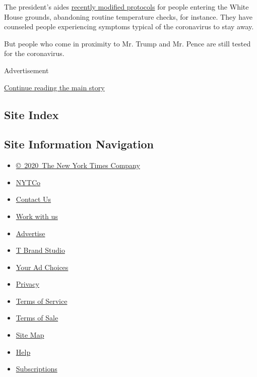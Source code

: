 The president's aides
\href{https://www.nytimes.com/2020/06/22/us/politics/white-house-coronavirus-restrictions.html}{recently
modified protocols} for people entering the White House grounds,
abandoning routine temperature checks, for instance. They have counseled
people experiencing symptoms typical of the coronavirus to stay away.

But people who come in proximity to Mr. Trump and Mr. Pence are still
tested for the coronavirus.

Advertisement

\protect\hyperlink{after-bottom}{Continue reading the main story}

\hypertarget{site-index}{%
\subsection{Site Index}\label{site-index}}

\hypertarget{site-information-navigation}{%
\subsection{Site Information
Navigation}\label{site-information-navigation}}

\begin{itemize}
\tightlist
\item
  \href{https://help.nytimes.com/hc/en-us/articles/115014792127-Copyright-notice}{©~2020~The
  New York Times Company}
\end{itemize}

\begin{itemize}
\tightlist
\item
  \href{https://www.nytco.com/}{NYTCo}
\item
  \href{https://help.nytimes.com/hc/en-us/articles/115015385887-Contact-Us}{Contact
  Us}
\item
  \href{https://www.nytco.com/careers/}{Work with us}
\item
  \href{https://nytmediakit.com/}{Advertise}
\item
  \href{http://www.tbrandstudio.com/}{T Brand Studio}
\item
  \href{https://www.nytimes.com/privacy/cookie-policy\#how-do-i-manage-trackers}{Your
  Ad Choices}
\item
  \href{https://www.nytimes.com/privacy}{Privacy}
\item
  \href{https://help.nytimes.com/hc/en-us/articles/115014893428-Terms-of-service}{Terms
  of Service}
\item
  \href{https://help.nytimes.com/hc/en-us/articles/115014893968-Terms-of-sale}{Terms
  of Sale}
\item
  \href{https://spiderbites.nytimes.com}{Site Map}
\item
  \href{https://help.nytimes.com/hc/en-us}{Help}
\item
  \href{https://www.nytimes.com/subscription?campaignId=37WXW}{Subscriptions}
\end{itemize}
